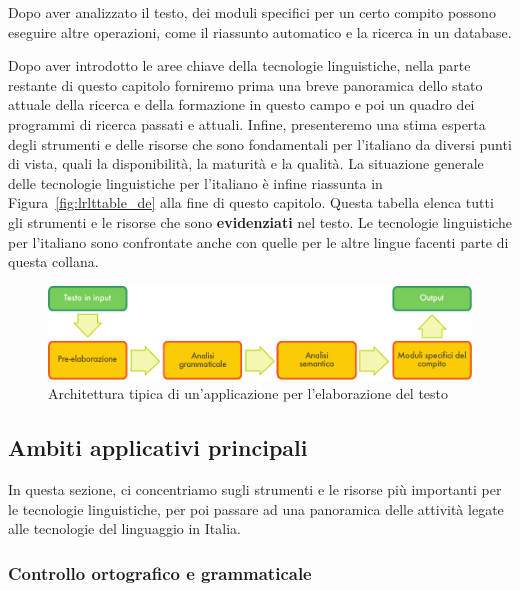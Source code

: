 \begin{multicols}{2}
Dopo aver analizzato il testo, dei moduli specifici per un certo compito
possono eseguire altre operazioni, come il riassunto automatico e la ricerca
in un database.

Dopo aver introdotto le aree chiave della tecnologie linguistiche, 
nella parte restante di questo capitolo forniremo
prima una breve panoramica dello stato attuale della ricerca e della
formazione in questo campo e poi un quadro dei programmi di ricerca
passati e attuali. Infine, presenteremo una stima esperta degli
strumenti e delle risorse che sono fondamentali per l'italiano da diversi
punti di vista, quali la disponibilit\`{a}, la maturit\`{a} e la qualit\`{a}. 
La situazione generale delle tecnologie linguistiche per l'italiano \`{e} 
infine riassunta in Figura~\ref{fig:lrlttable_de} alla fine di questo capitolo. Questa tabella elenca tutti gli strumenti e le risorse che sono \textbf{evidenziati} nel testo. Le tecnologie linguistiche per l'italiano sono confrontate anche con quelle per le altre lingue facenti parte di questa collana.



\begin{figure}[htb]
  \center
  \includegraphics[width=\textwidth]{../_media/italian/text_processing_app_architecture}
  \caption{Architettura tipica di un'applicazione per l'elaborazione del testo}
  \label{fig:textprocessingarch_de}
\end{figure}


\subsection{Ambiti applicativi principali} 

In questa sezione, ci concentriamo sugli strumenti e le risorse pi\`{u}
importanti per le tecnologie linguistiche, per poi passare ad una panoramica
delle attivit\`{a} legate alle tecnologie del linguaggio in Italia. 

\subsubsection{Controllo ortografico e \newline \mbox{grammaticale}}


\end{multicols}
